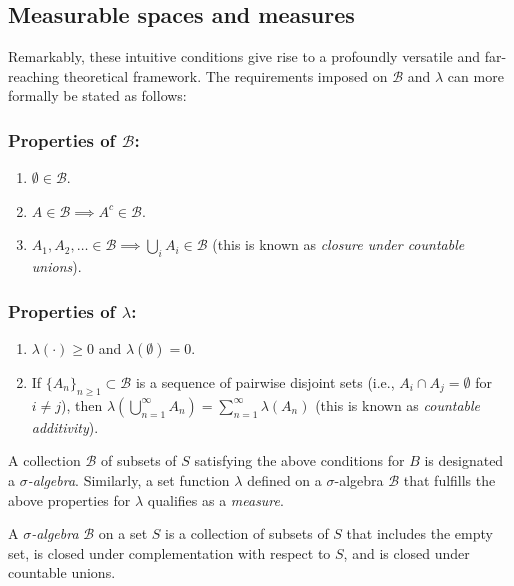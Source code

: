 \subsection{Measurable spaces and measures}
Remarkably, these  intuitive conditions give rise to a profoundly versatile and far-reaching theoretical framework. The requirements imposed on $\mathcal{B}$ and $\lambda$ can more formally be stated as follows:

\subsubsection*{Properties of $\mathcal{B}$:}
\begin{enumerate}
    \item $\emptyset \in \mathcal{B}$.
    \item $A \in \mathcal{B}  \implies A^c \in \mathcal{B}$. 
    \item  $A_1, A_2, \dots \in \mathcal{B} \implies \bigcup_i A_i \in \mathcal{B}$ (this is known as \emph{closure
 under countable unions}).
\end{enumerate}

\subsubsection*{Properties of $\lambda$:}
\begin{enumerate}
    \item $\lambda(\cdot) \geq 0$  and $\lambda(\emptyset) = 0$.
    \item  If \(\{A_n\}_{n \geq 1} \subset \mathcal{B}\) is a sequence of pairwise disjoint sets (i.e., \(A_i \cap A_j = \emptyset\) for \(i \neq j\)), then
    $\lambda\left( \bigcup_{n=1}^\infty A_n \right) = \sum_{n=1}^\infty \lambda(A_n)$ (this is known as \emph{countable additivity}). 
\end{enumerate}

A collection $\mathcal{B}$ of subsets of $S$ satisfying the above conditions for $B$ is designated a $\sigma$\emph{-algebra}. Similarly, a set function $\lambda$ defined on a $\sigma$-algebra $\mathcal{B}$ that fulfills the above properties for $\lambda$ qualifies as a \emph{measure}.

\begin{definition} 
  A $\sigma$\emph{-algebra} $\mathcal{B}$ on a set $S$ is a collection of subsets of $S$ that includes the empty set, is closed under complementation with respect to $S$, and is closed under countable unions. 
\end{definition}

